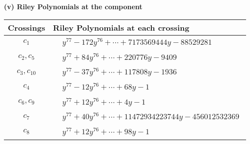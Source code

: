 \documentclass[1p]{elsarticle_modified}
\theoremstyle{definition}
\begin{document}
\newpage\renewcommand{\arraystretch}{1}
\flushleft \textbf{(v) Riley Polynomials at the component}\newline \\
\begin{tabular}{m{50pt}|m{274pt}}
Crossings & \hspace{64pt}Riley Polynomials at each crossing \\
\hline $$\begin{aligned}c_{1}\end{aligned}$$&$\begin{aligned}
&y^{77}-172 y^{76}+\cdots+7173569444 y-88529281
\end{aligned}$\\
\hline $$\begin{aligned}c_{2},c_{5}\end{aligned}$$&$\begin{aligned}
&y^{77}+84 y^{76}+\cdots+220776 y-9409
\end{aligned}$\\
\hline $$\begin{aligned}c_{3},c_{10}\end{aligned}$$&$\begin{aligned}
&y^{77}-37 y^{76}+\cdots+117808 y-1936
\end{aligned}$\\
\hline $$\begin{aligned}c_{4}\end{aligned}$$&$\begin{aligned}
&y^{77}-12 y^{76}+\cdots+68 y-1
\end{aligned}$\\
\hline $$\begin{aligned}c_{6},c_{9}\end{aligned}$$&$\begin{aligned}
&y^{77}+12 y^{76}+\cdots+4 y-1
\end{aligned}$\\
\hline $$\begin{aligned}c_{7}\end{aligned}$$&$\begin{aligned}
&y^{77}+40 y^{76}+\cdots+11472934223744 y-456012532369
\end{aligned}$\\
\hline $$\begin{aligned}c_{8}\end{aligned}$$&$\begin{aligned}
&y^{77}+12 y^{76}+\cdots+98 y-1
\end{aligned}$\\

\end{tabular}
\end{document}
